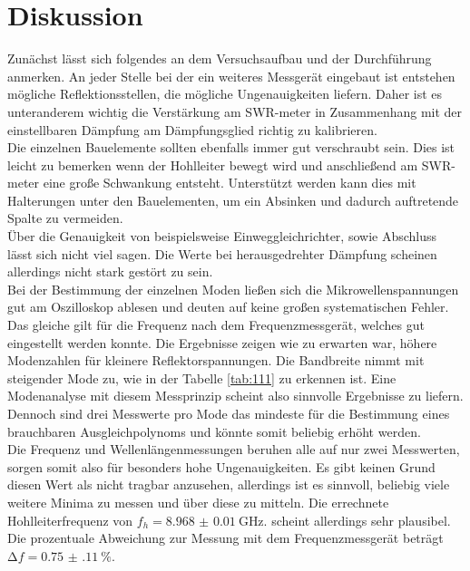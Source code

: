 \section{Diskussion}

Zunächst lässt sich folgendes an dem Versuchsaufbau und der Durchführung anmerken. An jeder Stelle bei der ein weiteres Messgerät
eingebaut ist entstehen mögliche Reflektionsstellen, die mögliche Ungenauigkeiten liefern. Daher ist es 
unteranderem wichtig die Verstärkung am SWR-meter in Zusammenhang mit der einstellbaren Dämpfung am 
Dämpfungsglied richtig zu kalibrieren. 
\\
Die einzelnen Bauelemente sollten ebenfalls immer gut verschraubt sein. Dies ist leicht zu bemerken wenn der Hohlleiter bewegt wird und 
anschließend am SWR-meter eine große Schwankung entsteht. Unterstützt werden kann dies mit Halterungen unter den Bauelementen, um ein Absinken und dadurch auftretende
Spalte zu vermeiden.
\\
Über die Genauigkeit von beispielsweise Einweggleichrichter, sowie Abschluss lässt sich nicht viel sagen. Die Werte bei
herausgedrehter Dämpfung scheinen allerdings nicht stark gestört zu sein.
\\
\newline
Bei der Bestimmung der einzelnen Moden ließen sich die Mikrowellenspannungen gut am Oszilloskop ablesen und deuten auf 
keine großen systematischen Fehler. Das gleiche gilt für die Frequenz nach dem Frequenzmessgerät, welches gut eingestellt werden konnte.
Die Ergebnisse zeigen wie zu erwarten war, höhere Modenzahlen für kleinere Reflektorspannungen. Die Bandbreite nimmt mit steigender Mode zu, wie in 
der Tabelle \ref{tab:111} zu erkennen ist. Eine Modenanalyse mit diesem Messprinzip scheint also sinnvolle Ergebnisse zu liefern. Dennoch sind drei Messwerte
pro Mode das mindeste für die Bestimmung eines brauchbaren Ausgleichpolynoms und könnte somit beliebig erhöht werden.
\\
\newline
Die Frequenz und Wellenlängenmessungen beruhen alle auf nur zwei Messwerten, sorgen somit also für besonders hohe Ungenauigkeiten. Es gibt keinen Grund diesen
Wert als nicht tragbar anzusehen, allerdings ist es sinnvoll, beliebig viele weitere Minima zu messen und über diese zu mitteln. Die errechnete Hohlleiterfrequenz
von $f_h = \SI{8.968(10)}{\giga\hertz}.$ scheint allerdings sehr plausibel. Die prozentuale Abweichung zur Messung mit dem Frequenzmessgerät beträgt $\increment f = \SI{0.75(11)}{\percent}$.
\\
